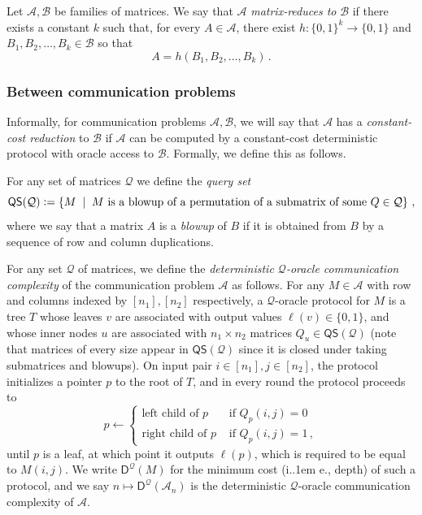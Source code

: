 \documentclass{theoretics}
\makeatletter
\newcommand{\define}{\vcentcolon=}
\newcommand{\zo}{\{0,1\}}
\newcommand{\cA}{\ensuremath{\mathcal{A}}}
\newcommand{\cB}{\ensuremath{\mathcal{B}}}
\newcommand{\cQ}{\ensuremath{\mathcal{Q}}}
\newcommand*\ie{i.\kern.1em e.\@\xspace} %
\makeatother
\begin{document}
\begin{definition}
\label{def:matrix-reductions}
Let $\cA, \cB$ be families of matrices. We say that $\cA$ \emph{matrix-reduces to} $\cB$ if there
exists a constant $k$ such that, for every $A \in \cA$, there
exist $h : \zo^k \to \zo$ and $B_1, B_2, \dotsc, B_k \in \cB$ so that
\[
  A = h(B_1, B_2, \dotsc, B_k) \,.
\]
\end{definition}


\subsubsection{Between communication problems}
\newcommand{\QS}{\mathsf{QS}}
\newcommand{\D}{\mathsf{D}}

Informally, for communication problems $\cA, \cB$, we will say that $\cA$ has a \emph{constant-cost
reduction} to $\cB$ if $\cA$ can be computed by a constant-cost deterministic protocol with oracle
access to $\cB$.  Formally, we define this as follows.

\begin{definition}
\label{def:query-set}
For any set of matrices $\cQ$ we define the \emph{query set}
\[
\QS(\cQ) \define \left\{ M \;\mid\; M \text{ is a blowup of a permutation of a submatrix of some } Q \in \cQ
\right\} \,,
\]
where we say that a matrix $A$ is a \emph{blowup} of $B$ if it is obtained from $B$ by a sequence of row and
column duplications.
\end{definition}

\begin{definition}
\label{def:oracle-communication}
For any set $\cQ$ of matrices, we define the \emph{deterministic $\cQ$-oracle communication
complexity} of the communication problem $\cA$ as follows. For any $M \in \cA$ with row and columns
indexed by $[n_1], [n_2]$ respectively, a $\cQ$-oracle protocol for $M$ is a tree $T$ whose leaves
$v$ are associated with output values $\ell(v) \in \zo$, and whose inner nodes $u$ are associated
with $n_1 \times n_2$ matrices $Q_u \in \QS(\cQ)$ (note that matrices of every size appear in
$\QS(\cQ)$ since it is closed under taking submatrices and blowups). On input pair $i \in [n_1], j \in [n_2]$,
the protocol initializes a pointer $p$ to the root of $T$, and in every round the protocol proceeds
to
\[
  p \gets \begin{cases}
    \text{left child of $p$} &\text{ if } Q_p(i, j) = 0 \\
    \text{right child of $p$} &\text{ if } Q_p(i, j) = 1 \,,
  \end{cases}
\]
until $p$ is a leaf, at which point it outputs $\ell(p)$, which is required to be equal to $M(i,j)$.
We write $\D^\cQ(M)$ for the minimum cost (\ie, depth) of such a protocol, and we say $n \mapsto
\D^\cQ(\cA_n)$ is the deterministic $\cQ$-oracle communication complexity of $\cA$.
\end{definition}
\end{document}
